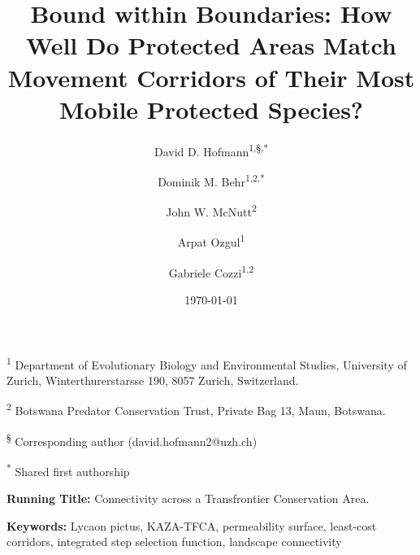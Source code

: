 \documentclass[abstract=on,10pt,a4paper,bibliography=totocnumbered]{article}
\title{Bound within Boundaries: How Well Do Protected Areas Match Movement
Corridors of Their Most Mobile Protected Species?}
\author{
  David D. Hofmann\textsuperscript{1,\S,*} \and
  Dominik M. Behr\textsuperscript{1,2,*} \and
  John W. McNutt\textsuperscript{2} \and
  Arpat Ozgul\textsuperscript{1} \and
  Gabriele Cozzi\textsuperscript{1,2}
}
\date{\today}
\begin{document}



\maketitle

\begin{flushleft}

\vspace{0.5cm}

\textsuperscript{1} Department of Evolutionary Biology and Environmental
Studies, University of Zurich, Winterthurerstarsse 190, 8057 Zurich,
Switzerland.

\textsuperscript{2} Botswana Predator Conservation Trust, Private Bag 13, Maun,
Botswana.

\textsuperscript{\S} Corresponding author (david.hofmann2@uzh.ch)

\textsuperscript{*} Shared first authorship

\vspace{4cm}

\textbf{Running Title:} Connectivity across a Transfrontier Conservation Area.

\vspace{0.5cm}

\textbf{Keywords:} Lycaon pictus, KAZA-TFCA, permeability surface, least-cost
corridors, integrated step selection function, landscape connectivity

\end{flushleft}
\end{document}
